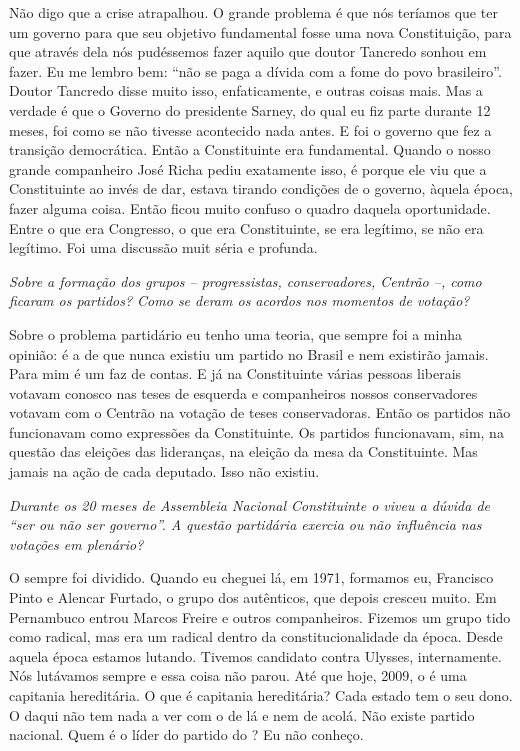 Não digo que a crise atrapalhou. O grande problema é que
nós teríamos que ter um governo para que seu objetivo fundamental fosse
uma nova Constituição, para que através dela nós pudéssemos fazer aquilo
que doutor Tancredo sonhou em fazer. Eu me lembro bem: ``não se paga a
dívida com a fome do povo brasileiro''. Doutor Tancredo disse muito
isso, enfaticamente, e outras coisas mais. Mas a verdade é que o Governo
do presidente Sarney, do qual eu fiz parte durante 12 meses, foi como se
não tivesse acontecido nada antes. E foi o governo que fez a transição
democrática. Então a Constituinte era fundamental. Quando o nosso grande
companheiro José Richa pediu exatamente isso, é porque ele viu que a
Constituinte ao invés de dar, estava tirando condições de o governo,
àquela época, fazer alguma coisa. Então ficou muito confuso o quadro
daquela oportunidade. Entre o que era Congresso, o que era Constituinte,
se era legítimo, se não era legítimo. Foi uma discussão muit séria e
profunda.

\medskip

\emph{Sobre a formação dos grupos -- progressistas, conservadores,
Centrão --, como ficaram os partidos? Como se deram os acordos nos
momentos de votação?}

Sobre o problema partidário eu tenho uma teoria, que
sempre foi a minha opinião: é a de que nunca existiu um partido no
Brasil e nem existirão jamais. Para mim é um faz de contas. E já na
Constituinte várias pessoas liberais votavam conosco nas teses de
esquerda e companheiros nossos conservadores votavam com o Centrão na
votação de teses conservadoras. Então os partidos não funcionavam como
expressões da Constituinte. Os partidos funcionavam, sim, na questão das
eleições das lideranças, na eleição da mesa da Constituinte. Mas jamais
na ação de cada deputado. Isso não existiu.

\medskip

\emph{Durante os 20 meses de Assembleia Nacional Constituinte o 
viveu a dúvida de ``ser ou não ser governo''. A questão partidária
exercia ou não influência nas votações em plenário?}

O  sempre foi dividido. Quando eu cheguei lá, em
1971, formamos eu, Francisco Pinto e Alencar Furtado, o grupo dos
autênticos, que depois cresceu muito. Em Pernambuco entrou Marcos Freire
e outros companheiros. Fizemos um grupo tido como radical, mas era um
radical dentro da constitucionalidade da época. Desde aquela época
estamos lutando. Tivemos candidato contra Ulysses, internamente. Nós
lutávamos sempre e essa coisa não parou. Até que hoje, 2009, o  é
uma capitania hereditária. O que é capitania hereditária? Cada estado
tem o seu dono. O  daqui não tem nada a ver com o  de lá e nem
de acolá. Não existe partido nacional. Quem é o líder do partido do
? Eu não conheço.

